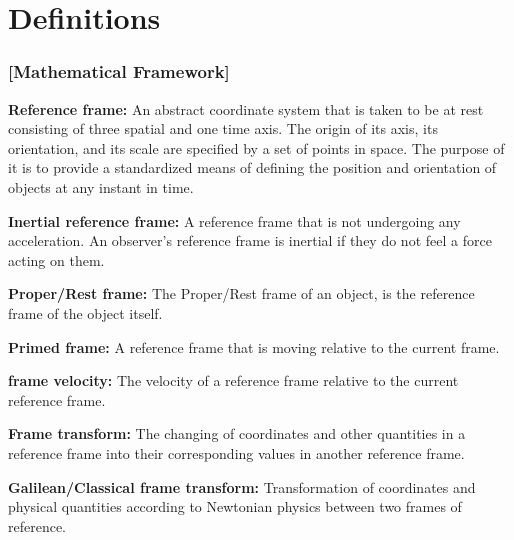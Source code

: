
\section{Definitions}

\subsubsection{[Mathematical Framework]}%

\noindent \hypertarget{def-Reference-frame}{\textbf{Reference frame:}}
An abstract coordinate system that is taken to be at rest consisting of three spatial and one time axis. The origin of its axis, its orientation, and its scale are specified by a set of points in space. The purpose of it is to provide a standardized means of defining the position and orientation of objects at any instant in time.

\noindent \hypertarget{def-Inertial-reference-frame}{\textbf{Inertial reference frame:}}
A reference frame that is not undergoing any acceleration. An observer's reference frame is inertial if they do not feel a force acting on them.

\noindent \hypertarget{def-proper-frame}{\textbf{Proper/Rest frame:}}
The Proper/Rest frame of an object, is the reference frame of the object itself.


\noindent \hypertarget{def-Primed-Frame}{\textbf{Primed frame:}}
A reference frame that is moving relative to the current frame.

\noindent \hypertarget{def-frame-velocity}{\textbf{frame velocity:}}
The velocity of a reference frame relative to the current reference frame.

\noindent \hypertarget{def-transform}{\textbf{Frame transform:}}
The changing of coordinates and other quantities in a reference frame into their corresponding values in another reference frame.

\noindent \hypertarget{def-galilean-transform}{\textbf{Galilean/Classical frame transform:}}
Transformation of coordinates and physical quantities according to Newtonian physics between two frames of reference.

